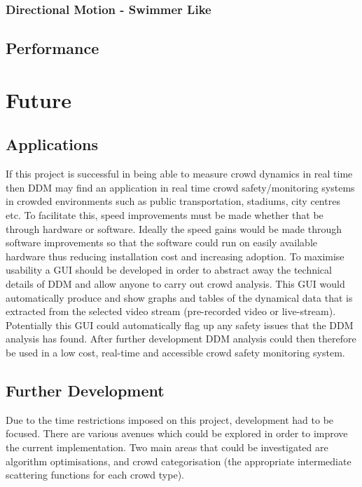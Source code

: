 \documentclass[11pt]{article}
\begin{document}
\subsubsection{Directional Motion - Swimmer Like}

\subsection{Performance}
\label{section:performance}


\section{Future}

\subsection{Applications}
If this project is successful in being able to measure crowd dynamics in real time then DDM may find an application in real time crowd safety/monitoring systems in crowded environments such as public transportation, stadiums, city centres etc. To facilitate this, speed improvements must be made whether that be through hardware or software. Ideally the speed gains would be made through software improvements so that the software could run on easily available hardware thus reducing installation cost and increasing adoption. To maximise usability a GUI should be developed in order to abstract away the technical details of DDM and allow anyone to carry out crowd analysis. This GUI would automatically produce and show graphs and tables of the dynamical data that is extracted from the selected video stream (pre-recorded video or live-stream). Potentially this GUI could automatically flag up any safety issues that the DDM analysis has found. After further development DDM analysis could then therefore be used in a low cost, real-time and accessible crowd safety monitoring system.

\subsection{Further Development}
Due to the time restrictions imposed on this project, development had to be focused. There are various avenues which could be explored in order to improve the current implementation. Two main areas that could be investigated are algorithm optimisations, and crowd categorisation (the appropriate intermediate scattering functions for each crowd type).
\end{document}
